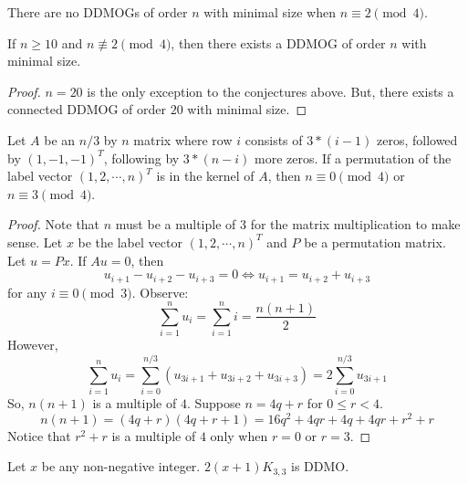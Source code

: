 \begin{conjecture}
    There are no DDMOGs of order \(n\)
    with minimal size when \(n \equiv 2 \pmod{4}\).
\end{conjecture}

\begin{corollary}
    If \(n \ge 10\) and \(n \not \equiv 2 \pmod{4}\),
    then there exists a DDMOG of order \(n\) with minimal size.
\end{corollary}
\begin{proof}
    \(n = 20\) is the only exception to the conjectures above.
    But, there exists a connected DDMOG of order \(20\) with minimal size.
\end{proof}



\begin{proposition}
Let \(A\) be an \(n/3\) by \(n\) matrix where row \(i\)
consists of \(3 * (i - 1)\) zeros, followed by \((1, -1, -1)^T\), following by
\(3 * (n - i)\) more zeros.
If a permutation of the label vector \((1,2, \cdots, n)^T\) is in the kernel
of \(A\), then \(n \equiv 0 \pmod{4}\) or \(n \equiv 3 \pmod{4}\).
\end{proposition}

\begin{proof}
Note that \(n\) must be a multiple of \(3\) for the matrix multiplication
to make sense.
Let \(x\) be the label vector \((1,2,\cdots, n)^T\) and \(P\) be a permutation matrix.
Let \(u = Px\).
If \(Au = 0\), then
\[
u_{i + 1} - u_{i+2}  - u_{i+3} = 0 \Leftrightarrow u_{i+1} = u_{i+2} + u_{i+3}
\]
for any \(i \equiv 0 \pmod{3}\).
Observe:
\[
\sum_{i=1}^n u_i = \sum_{i=1}^n i = \frac{n(n+1)}{2}
\]
However,
\[
\sum_{i=1}^n u_i = \sum_{i=0}^{n/3} \left(u_{3i + 1} + u_{3i + 2} + u_{3i + 3}\right) = 2 \sum_{i=0}^{n/3} u_{3i + 1}
\]
So, \(n(n+1)\) is a multiple of \(4\).
Suppose \(n = 4q + r\) for \(0 \le r < 4\).
\[
n(n+1) = (4q + r)(4q + r + 1) = 16q^2 + 4qr + 4q + 4qr + r^2 + r
\]
Notice that \(r^2 + r\) is a multiple of \(4\) only when \(r = 0\) or \(r = 3\).
\end{proof}

\begin{proposition}
    Let \(x\) be any non-negative integer.
    \(2(x+1)K_{3,3}\) is DDMO.
\end{proposition}


